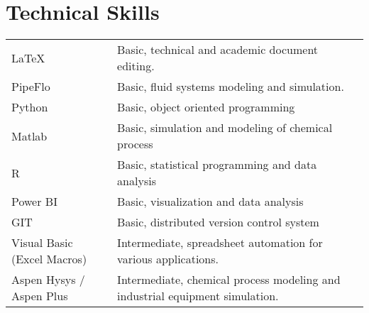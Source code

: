 \documentclass[a4paper,12pt]{article}
\begin{document}

\section{Technical Skills}
\begin{tabularx}{\linewidth}{@{}l X@{}}
\LaTeX &  \normalsize{Basic, technical and academic document editing.}\\
PipeFlo &  \normalsize{Basic, fluid systems modeling and simulation.}\\
Python &  \normalsize{Basic, object oriented programming}\\
Matlab &  \normalsize{Basic, simulation and modeling of chemical process}\\
R &  \normalsize{Basic, statistical programming and data analysis}\\
Power BI &  \normalsize{Basic, visualization and data analysis}\\
GIT&  \normalsize{Basic, distributed version control system}\\
Visual Basic (Excel Macros)  &  \normalsize{Intermediate, spreadsheet automation for various applications.}\\ 
Aspen Hysys / Aspen Plus  &  \normalsize{Intermediate, chemical process modeling and industrial equipment simulation.}\\  
\end{tabularx}
\vfill
{}
\end{document}
